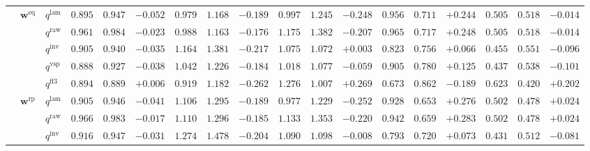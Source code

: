 \documentclass{article}
\begin{document}
\begin{table}[!htbp]
{\begin{tabular}{lll ccc ccc ccc ccc ccc}
\cmidrule(lr){2-18}
 & $\mathbf{w}^{\mathrm{eq}}$ & $q^{\mathrm{lam}}$ & $0.895$ & $0.947$ & \cellcolor{negred!50}$-0.052$ & $0.979$ & $1.168$ & \cellcolor{negred!50}$-0.189$ & $0.997$ & $1.245$ & \cellcolor{negred!50}$-0.248$ & $0.956$ & $0.711$ & \cellcolor{posgreen!50}$+0.244$ & $0.505$ & $0.518$ & \cellcolor{negred!50}$-0.014$ \\
 &  & $q^{\mathrm{raw}}$ & $0.961$ & $0.984$ & \cellcolor{negred!50}$-0.023$ & $0.988$ & $1.163$ & \cellcolor{negred!50}$-0.176$ & $1.175$ & $1.382$ & \cellcolor{negred!50}$-0.207$ & $0.965$ & $0.717$ & \cellcolor{posgreen!50}$+0.248$ & $0.505$ & $0.518$ & \cellcolor{negred!50}$-0.014$ \\
 &  & $q^{\mathrm{inv}}$ & $0.905$ & $0.940$ & \cellcolor{negred!50}$-0.035$ & $1.164$ & $1.381$ & \cellcolor{negred!50}$-0.217$ & $1.075$ & $1.072$ & \cellcolor{posgreen!50}$+0.003$ & $0.823$ & $0.756$ & \cellcolor{posgreen!50}$+0.066$ & $0.455$ & $0.551$ & \cellcolor{negred!50}$-0.096$ \\
 &  & $q^{\mathrm{vsp}}$ & $0.888$ & $0.927$ & \cellcolor{negred!50}$-0.038$ & $1.042$ & $1.226$ & \cellcolor{negred!50}$-0.184$ & $1.018$ & $1.077$ & \cellcolor{negred!50}$-0.059$ & $0.905$ & $0.780$ & \cellcolor{posgreen!50}$+0.125$ & $0.437$ & $0.538$ & \cellcolor{negred!50}$-0.101$ \\
 &  & $q^{\mathrm{ff3}}$ & $0.894$ & $0.889$ & \cellcolor{posgreen!50}$+0.006$ & $0.919$ & $1.182$ & \cellcolor{negred!50}$-0.262$ & $1.276$ & $1.007$ & \cellcolor{posgreen!50}$+0.269$ & $0.673$ & $0.862$ & \cellcolor{negred!50}$-0.189$ & $0.623$ & $0.420$ & \cellcolor{posgreen!50}$+0.202$ \\
\cmidrule(lr){2-18}
 & $\mathbf{w}^{\mathrm{rp}}$ & $q^{\mathrm{lam}}$ & $0.905$ & $0.946$ & \cellcolor{negred!50}$-0.041$ & $1.106$ & $1.295$ & \cellcolor{negred!50}$-0.189$ & $0.977$ & $1.229$ & \cellcolor{negred!50}$-0.252$ & $0.928$ & $0.653$ & \cellcolor{posgreen!50}$+0.276$ & $0.502$ & $0.478$ & \cellcolor{posgreen!50}$+0.024$ \\
 &  & $q^{\mathrm{raw}}$ & $0.966$ & $0.983$ & \cellcolor{negred!50}$-0.017$ & $1.110$ & $1.296$ & \cellcolor{negred!50}$-0.185$ & $1.133$ & $1.353$ & \cellcolor{negred!50}$-0.220$ & $0.942$ & $0.659$ & \cellcolor{posgreen!50}$+0.283$ & $0.502$ & $0.478$ & \cellcolor{posgreen!50}$+0.024$ \\
 &  & $q^{\mathrm{inv}}$ & $0.916$ & $0.947$ & \cellcolor{negred!50}$-0.031$ & $1.274$ & $1.478$ & \cellcolor{negred!50}$-0.204$ & $1.090$ & $1.098$ & \cellcolor{negred!50}$-0.008$ & $0.793$ & $0.720$ & \cellcolor{posgreen!50}$+0.073$ & $0.431$ & $0.512$ & \cellcolor{negred!50}$-0.081$ \\

\end{tabular}}
\end{table}
\end{document}
